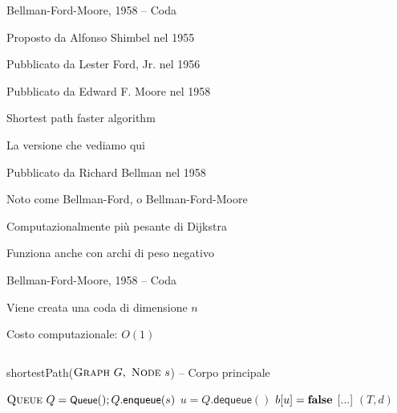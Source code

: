 \begin{frame}{Bellman-Ford-Moore, 1958 -- Coda}

\vspace{-9pt}
\begin{myboxtitle}[Storia]
\BI
\item Proposto da \alert{Alfonso Shimbe}l nel 1955
\item Pubblicato da \alert{Lester Ford, Jr}. nel 1956
\item Pubblicato da \alert{Edward F. Moore} nel 1958 
  \BI
  \item \alert{Shortest path faster algorithm}
  \item La versione che vediamo qui
  \EI
\item Pubblicato da \alert{Richard Bellman} nel 1958
\item Noto come Bellman-Ford, o Bellman-Ford-Moore
\EI
\end{myboxtitle}

\begin{myboxtitle}[Note]
\BI
\item Computazionalmente più pesante di Dijkstra
\item Funziona anche con archi di peso negativo
\EI
\end{myboxtitle}

\end{frame}


\begin{frame}{Bellman-Ford-Moore, 1958 -- Coda}

\vspace{-9pt}
\begin{myboxtitle}
\BI
\item Viene creata una coda di dimensione $n$
\item Costo computazionale: $O(1)$
\EI
\end{myboxtitle}

\vspace{-18pt}
\begin{columns}
\small
\begin{Procedure}
\caption[A]{\textsf{shortestPath}($\textsc{Graph}\ G,\ \textsc{Node}\ s$) -- Corpo principale}
\alert{$\textsc{Queue}\ Q = \textsf{{\small Queue}}(); Q.\textsf{enqueue}(s)$}\;
{
  $u = Q.\textsf{dequeue}()$\;
  $b[u] = \FALSE$\;
  {
    {
      [...]
    }
  }
}
\Return $(T,d)$
\end{Procedure}
\end{columns}

\end{frame}


